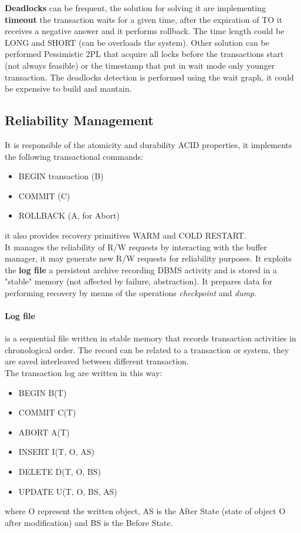 \documentclass[12pt]{article}
\begin{document}
\textbf{Deadlocks} can be frequent, the solution for solving it are implementing \textbf{timeout} the transaction waits for a given time, after the expiration of TO it receives a negative answer and it performs rollback. The time length could be LONG and SHORT (can be overloads the system). Other solution can be performed Pessimistic 2PL that acquire all locks before the transactions start (not always feasible) or the timestamp that put in wait mode only younger transaction. The deadlocks detection is performed using the wait graph, it could be expensive to build and mantain.

\subsection{Reliability Management}
It is responsible of the atomicity and durability ACID properties, it implements the following transactional commands:
\begin{itemize}
  \item BEGIN transaction (B)
  \item COMMIT (C)
  \item ROLLBACK (A, for Abort)
\end{itemize}
it also provides recovery primitives WARM and COLD RESTART.\\
It manages the reliability of R/W requests by interacting with the buffer manager, it may generate new R/W requests for reliability purposes. It exploits the \textbf{log file} a persistent archive recording DBMS activity and is stored in a "stable" memory (not affected by failure, abstraction). It prepares data for performing recovery by means of the operations \textit{checkpoint} and \textit{dump}.\\
\paragraph{Log file} is a sequential file written in stable memory that records transaction activities in chronological order. The record can be related to a transaction or system, they are saved interleaved between different transaction.\\
The transaction log are written in this way:
\begin{itemize}
  \item BEGIN B(T)
  \item COMMIT C(T)
  \item ABORT A(T)
  \item INSERT I(T, O, AS)
  \item DELETE D(T, O, BS)
  \item UPDATE U(T, O, BS, AS)
\end{itemize}
where O represent the written object, AS is the After State (state of object O after modification) and BS is the Before State.\\
\end{document}

